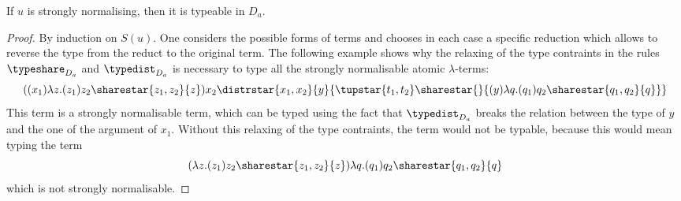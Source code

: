 % 
% 
% 
% 
% 

\begin{ALtheorem}
If $u$ is strongly normalising, then it is typeable in $D_a$.
\end{ALtheorem}

\begin{proof}
By induction on $S(u)$. One considers the possible forms of terms and chooses in each case a specific reduction which allows to reverse the type from the reduct to the original term. The following example shows why the relaxing of the type contraints in the rules $\typeshare_{D_a}$ and $\typedist_{D_a}$ is necessary to type all the strongly normalisable atomic $\lambda$-terms:
\[
 ((x_1)
\lambda z.(z_1)z_2\sharestar{z_1,z_2}{z})
x_2 \distrstar
{x_1,x_2}
{y}
{\tupstar{t_1,t_2}  \sharestar{}
                              {(y)\lambda q.(q_1)q_2 \sharestar{q_1,q_2}{q}}}
\]
This term is a strongly normalisable term, which can be typed using the fact that $\typedist_{D_a}$ breaks the relation between the type of $y$ and the one of the argument of $x_1$. Without this relaxing of the type contraints, the term would not be typable, because this  would mean typing the term
\[
(\lambda z.(z_1)z_2\sharestar{z_1,z_2}{z})\lambda q.(q_1)q_2 \sharestar{q_1,q_2}{q}
\]
which is not strongly normalisable. 


\end{proof}


